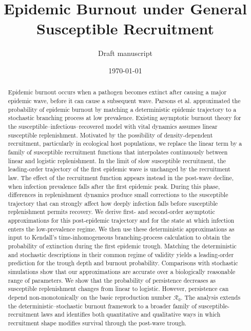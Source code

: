 \documentclass[11pt]{article}
\title{Epidemic Burnout under General Susceptible Recruitment}
\author{Draft manuscript}
\date{\today}
\newcommand{\Rzero}{\mathcal R_0}
\begin{document}
\maketitle

\begin{abstract}
Epidemic burnout occurs when a pathogen becomes extinct after causing a major epidemic wave, before it can cause a subsequent wave. Parsons et al. approximated the probability of epidemic burnout by matching a deterministic epidemic trajectory to a stochastic branching process at low prevalence. Existing asymptotic burnout theory for the susceptible--infectious--recovered model with vital dynamics assumes linear susceptible replenishment. Motivated by the possibility of density-dependent recruitment, particularly in ecological host populations, we replace the linear term by a family of susceptible recruitment functions that interpolates continuously between linear and logistic replenishment.
In the limit of slow susceptible recruitment, the leading-order trajectory of the first epidemic wave is unchanged by the recruitment law. The effect of the recruitment function appears instead in the post-wave decline, when infection prevalence falls after the first epidemic peak. During this phase, differences in replenishment dynamics produce small corrections to the susceptible trajectory that can strongly affect how deeply infection falls before susceptible replenishment permits recovery. We derive first- and second-order asymptotic approximations for this post-epidemic trajectory and for the state at which infection enters the low-prevalence regime. We then use these deterministic approximations as input to Kendall's time-inhomogeneous branching-process calculation to obtain the probability of extinction during the first epidemic trough. Matching the deterministic and stochastic descriptions in their common regime of validity yields a leading-order prediction for the trough depth and burnout probability.
Comparisons with stochastic simulations show that our approximations are accurate over a biologically reasonable range of parameters. We show that the probability of persistence decreases as susceptible replenishment changes from linear to logistic. However, persistence can depend non-monotonically on the basic reproduction number \(\Rzero\).
 The analysis extends the deterministic--stochastic burnout framework to a broader family of susceptible-recruitment laws and identifies both quantitative and qualitative ways in which recruitment shape modifies survival through the post-wave trough.
\end{abstract}
\end{document}
